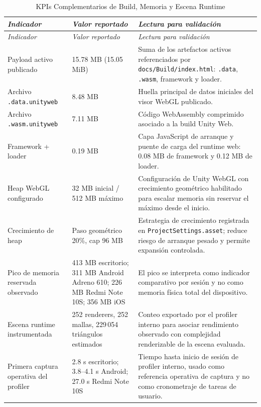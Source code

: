 \setlength{\LTpre}{-2.5pt}
{
\renewcommand{\arraystretch}{1.08}
\setlength{\tabcolsep}{3pt}
\begin{longtable}{p{4.5cm}p{3.6cm}p{7.8cm}}
    \caption{KPIs Complementarios de Build, Memoria y Escena Runtime}
    \label{tab:kpis_complementarios_build_memoria}\\
    \hline
    \textit{Indicador} & \textit{Valor reportado} & \textit{Lectura para validación} \\ \hline
    \endfirsthead
    \hline
    \textit{Indicador} & \textit{Valor reportado} & \textit{Lectura para validación} \\ \hline
    \endhead
    Payload activo publicado & 15.78 MB (15.05 MiB) & Suma de los artefactos activos referenciados por \texttt{docs/Build/index.html}: \texttt{.data}, \texttt{.wasm}, framework y loader. \\
    Archivo \texttt{.data.unityweb} & 8.48 MB & Huella principal de datos iniciales del visor WebGL publicado. \\
    Archivo \texttt{.wasm.unityweb} & 7.11 MB & Código WebAssembly comprimido asociado a la build Unity Web. \\
    Framework + loader & 0.19 MB & Capa JavaScript de arranque y puente de carga del runtime web: 0.08 MB de framework y 0.12 MB de loader. \\
    Heap WebGL configurado & 32 MB inicial / 512 MB máximo & Configuración de Unity WebGL con crecimiento geométrico habilitado para escalar memoria sin reservar el máximo desde el inicio. \\
    Crecimiento de heap & Paso geométrico 20\%, cap 96 MB & Estrategia de crecimiento registrada en \texttt{ProjectSettings.asset}; reduce riesgo de arranque pesado y permite expansión controlada. \\
    Pico de memoria reservada observado & 413 MB escritorio; 311 MB Android Adreno 610; 226 MB Redmi Note 10S; 356 MB iOS & El pico se interpreta como indicador comparativo por sesión y no como memoria física total del dispositivo. \\
    Escena runtime instrumentada & 252 renderers, 252 mallas, 229\,054 triángulos estimados & Conteo exportado por el profiler interno para asociar rendimiento observado con complejidad renderizable de la escena evaluada. \\
    Primera captura operativa del profiler & 2.8 s escritorio; 3.8--4.1 s Android; 27.0 s Redmi Note 10S & Tiempo hasta inicio de sesión de profiler interno, usado como referencia operativa de captura y no como cronometraje de tareas de usuario. \\ \hline

\end{longtable}}
